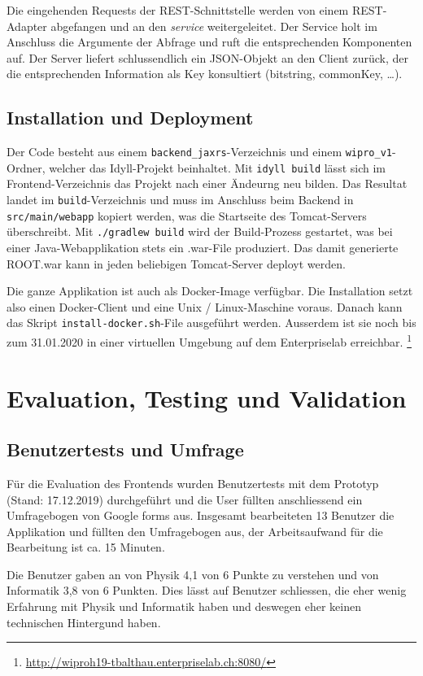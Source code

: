 \documentclass[a4paper,10.2pt,pdftex]{scrartcl}%
\begin{document}
Die eingehenden Requests der REST-Schnittstelle werden von einem REST-Adapter abgefangen und an den \emph{service} weitergeleitet. Der Service holt im Anschluss die Argumente der Abfrage und ruft die entsprechenden Komponenten auf. Der Server liefert schlussendlich ein JSON-Objekt an den Client zurück, der die entsprechenden Information als Key konsultiert (bitstring, commonKey, \dots). 


\subsection{Installation und Deployment}
Der Code besteht aus einem \texttt{backend\_jaxrs}-Verzeichnis und einem \texttt{wipro\_v1}-Ordner, welcher das Idyll-Projekt beinhaltet. Mit \texttt{idyll build} lässt sich im Frontend-Verzeichnis das Projekt nach einer Ändeurng neu bilden. Das Resultat landet im \texttt{build}-Verzeichnis und muss im Anschluss beim Backend in \texttt{src/main/webapp} kopiert werden, was die Startseite des Tomcat-Servers überschreibt. Mit \texttt{./gradlew build} wird der Build-Prozess gestartet, was bei einer Java-Webapplikation stets ein .war-File produziert. Das damit generierte ROOT.war kann in jeden beliebigen Tomcat-Server deployt werden. 

Die ganze Applikation ist auch als Docker-Image verfügbar. Die Installation setzt also einen Docker-Client und eine Unix / Linux-Maschine voraus. Danach kann das Skript \texttt{install-docker.sh}-File ausgeführt werden.  Ausserdem ist sie noch bis zum 31.01.2020 in einer virtuellen Umgebung auf dem Enterpriselab erreichbar. \footnote{\url{http://wiproh19-tbalthau.enterpriselab.ch:8080/}}

\section{Evaluation, Testing und Validation}
\subsection{Benutzertests und Umfrage}
Für die Evaluation des Frontends wurden Benutzertests mit dem Prototyp (Stand: 17.12.2019) durchgeführt und die User füllten anschliessend ein Umfragebogen von Google forms aus. Insgesamt bearbeiteten 13 Benutzer die Applikation und füllten den Umfragebogen aus, der Arbeitsaufwand für die Bearbeitung ist ca. 15 Minuten.

Die Benutzer gaben an von Physik 4,1 von 6 Punkte zu verstehen und von Informatik 3,8 von 6 Punkten. Dies lässt auf Benutzer schliessen, die eher wenig Erfahrung mit Physik und Informatik haben und deswegen eher keinen technischen Hintergund haben.
\end{document}
